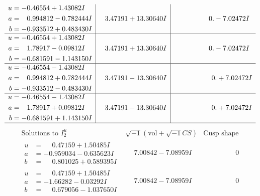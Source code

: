 \documentclass[1p]{elsarticle_modified}
\theoremstyle{definition}
\newcommand{\I}{\sqrt{-1}}
\begin{document}
$$\begin{array}{c|c|c}
\begin{aligned}
u &= -0.46554 + 1.43082 I \\
a &= \phantom{-}0.994812 - 0.782444 I \\
b &= -0.933512 + 0.483430 I\end{aligned}
 & \phantom{-}3.47191 + 13.30640 I & \phantom{-0.000000 } 0. - 7.02472 I \\ \hline\begin{aligned}
u &= -0.46554 + 1.43082 I \\
a &= \phantom{-}1.78917 - 0.09812 I \\
b &= -0.681591 - 1.143150 I\end{aligned}
 & \phantom{-}3.47191 + 13.30640 I & \phantom{-0.000000 } 0. - 7.02472 I \\ \hline\begin{aligned}
u &= -0.46554 - 1.43082 I \\
a &= \phantom{-}0.994812 + 0.782444 I \\
b &= -0.933512 - 0.483430 I\end{aligned}
 & \phantom{-}3.47191 - 13.30640 I & \phantom{-0.000000 -}0. + 7.02472 I \\ \hline\begin{aligned}
u &= -0.46554 - 1.43082 I \\
a &= \phantom{-}1.78917 + 0.09812 I \\
b &= -0.681591 + 1.143150 I\end{aligned}
 & \phantom{-}3.47191 - 13.30640 I & \phantom{-0.000000 -}0. + 7.02472 I\\
 \hline 
 \end{array}$$\newpage$$\begin{array}{c|c|c}  
\text{Solutions to }I^u_{2}& \I (\text{vol} + \sqrt{-1}CS) & \text{Cusp shape}\\
 \hline 
\begin{aligned}
u &= \phantom{-}0.47159 + 1.50485 I \\
a &= -0.959034 - 0.635623 I \\
b &= \phantom{-}0.801025 + 0.589395 I\end{aligned}
 & \phantom{-}7.00842 - 7.08959 I & \phantom{-0.000000 } 0 \\ \hline\begin{aligned}
u &= \phantom{-}0.47159 + 1.50485 I \\
a &= -1.66282 - 0.03292 I \\
b &= \phantom{-}0.679056 - 1.037650 I\end{aligned}
 & \phantom{-}7.00842 - 7.08959 I & \phantom{-0.000000 } 0 \\ \hline\begin{aligned}

\end{aligned}
\end{array}$$
\end{document}
